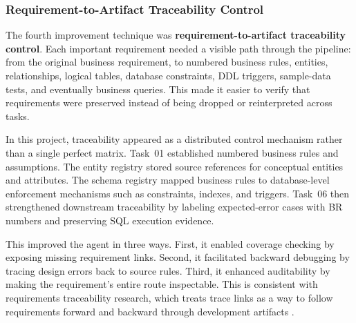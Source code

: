 \subsubsection{Requirement-to-Artifact Traceability Control}
The fourth improvement technique was \textbf{requirement-to-artifact traceability control}. Each important requirement needed a visible path through the pipeline: from the original business requirement, to numbered business rules, entities, relationships, logical tables, database constraints, DDL triggers, sample-data tests, and eventually business queries. This made it easier to verify that requirements were preserved instead of being dropped or reinterpreted across tasks.

In this project, traceability appeared as a distributed control mechanism rather than a single perfect matrix. Task~01 established numbered business rules and assumptions. The entity registry stored source references for conceptual entities and attributes. The schema registry mapped business rules to database-level enforcement mechanisms such as constraints, indexes, and triggers. Task~06 then strengthened downstream traceability by labeling expected-error cases with BR numbers and preserving SQL execution evidence.

This improved the agent in three ways. First, it enabled coverage checking by exposing missing requirement links. Second, it facilitated backward debugging by tracing design errors back to source rules. Third, it enhanced auditability by making the requirement's entire route inspectable. This is consistent with requirements traceability research, which treats trace links as a way to follow requirements forward and backward through development artifacts \cite{gotel-traceability}.




